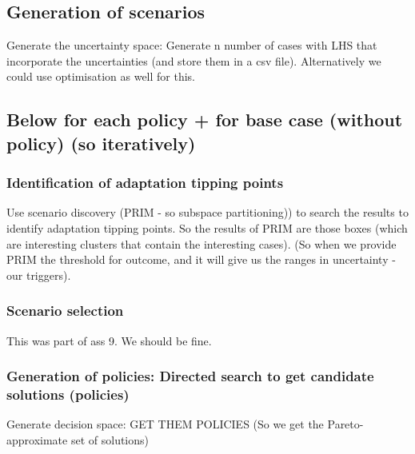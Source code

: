 \subsection{Generation of scenarios}
Generate the uncertainty space: Generate n number of cases with LHS that incorporate the uncertainties (and store them in a csv file). Alternatively we could use optimisation as well for this.

\subsection{Below for each policy + for base case (without policy) (so iteratively)}
\subsubsection{Identification of adaptation tipping points}
Use scenario discovery (PRIM - so subspace partitioning)) to search the results to identify adaptation tipping points. So the results of PRIM are those boxes (which are interesting clusters that contain the interesting cases). (So when we provide PRIM the threshold for outcome, and it will give us the ranges in uncertainty - our triggers).

\subsubsection{Scenario selection}
This was part of ass 9. We should be fine.

\subsubsection{Generation of policies: Directed search to get candidate solutions (policies)}
Generate decision space: GET THEM POLICIES
(So we get the Pareto-approximate set of solutions)


